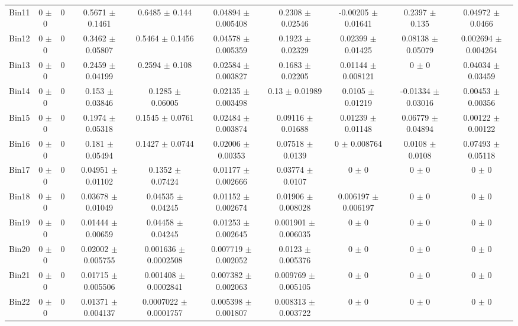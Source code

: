 \begin{tabular}{@{\extracolsep{4pt}}lccccccccc@{}}
     Bin11 & 0 $\pm$ 0 & 0 & 0.5671 $\pm$ 0.1461 & 0.6485 $\pm$ 0.144 & 0.04894 $\pm$ 0.005408 & 0.2308 $\pm$ 0.02546 & -0.00205 $\pm$ 0.01641 & 0.2397 $\pm$ 0.135 & 0.04972 $\pm$ 0.0466 \\ 
     Bin12 & 0 $\pm$ 0 & 0 & 0.3462 $\pm$ 0.05807 & 0.5464 $\pm$ 0.1456 & 0.04578 $\pm$ 0.005359 & 0.1923 $\pm$ 0.02329 & 0.02399 $\pm$ 0.01425 & 0.08138 $\pm$ 0.05079 & 0.002694 $\pm$ 0.004264 \\ 
     Bin13 & 0 $\pm$ 0 & 0 & 0.2459 $\pm$ 0.04199 & 0.2594 $\pm$ 0.108 & 0.02584 $\pm$ 0.003827 & 0.1683 $\pm$ 0.02205 & 0.01144 $\pm$ 0.008121 & 0 $\pm$ 0 & 0.04034 $\pm$ 0.03459 \\ 
     Bin14 & 0 $\pm$ 0 & 0 & 0.153 $\pm$ 0.03846 & 0.1285 $\pm$ 0.06005 & 0.02135 $\pm$ 0.003498 & 0.13 $\pm$ 0.01989 & 0.0105 $\pm$ 0.01219 & -0.01334 $\pm$ 0.03016 & 0.00453 $\pm$ 0.00356 \\ 
     Bin15 & 0 $\pm$ 0 & 0 & 0.1974 $\pm$ 0.05318 & 0.1545 $\pm$ 0.0761 & 0.02484 $\pm$ 0.003874 & 0.09116 $\pm$ 0.01688 & 0.01239 $\pm$ 0.01148 & 0.06779 $\pm$ 0.04894 & 0.00122 $\pm$ 0.00122 \\ 
     Bin16 & 0 $\pm$ 0 & 0 & 0.181 $\pm$ 0.05494 & 0.1427 $\pm$ 0.0744 & 0.02006 $\pm$ 0.00353 & 0.07518 $\pm$ 0.0139 & 0 $\pm$ 0.008764 & 0.0108 $\pm$ 0.0108 & 0.07493 $\pm$ 0.05118 \\ 
     Bin17 & 0 $\pm$ 0 & 0 & 0.04951 $\pm$ 0.01102 & 0.1352 $\pm$ 0.07424 & 0.01177 $\pm$ 0.002666 & 0.03774 $\pm$ 0.0107 & 0 $\pm$ 0 & 0 $\pm$ 0 & 0 $\pm$ 0 \\ 
     Bin18 & 0 $\pm$ 0 & 0 & 0.03678 $\pm$ 0.01049 & 0.04535 $\pm$ 0.04245 & 0.01152 $\pm$ 0.002674 & 0.01906 $\pm$ 0.008028 & 0.006197 $\pm$ 0.006197 & 0 $\pm$ 0 & 0 $\pm$ 0 \\ 
     Bin19 & 0 $\pm$ 0 & 0 & 0.01444 $\pm$ 0.00659 & 0.04458 $\pm$ 0.04245 & 0.01253 $\pm$ 0.002645 & 0.001901 $\pm$ 0.006035 & 0 $\pm$ 0 & 0 $\pm$ 0 & 0 $\pm$ 0 \\ 
     Bin20 & 0 $\pm$ 0 & 0 & 0.02002 $\pm$ 0.005755 & 0.001636 $\pm$ 0.0002508 & 0.007719 $\pm$ 0.002052 & 0.0123 $\pm$ 0.005376 & 0 $\pm$ 0 & 0 $\pm$ 0 & 0 $\pm$ 0 \\ 
     Bin21 & 0 $\pm$ 0 & 0 & 0.01715 $\pm$ 0.005506 & 0.001408 $\pm$ 0.0002841 & 0.007382 $\pm$ 0.002063 & 0.009769 $\pm$ 0.005105 & 0 $\pm$ 0 & 0 $\pm$ 0 & 0 $\pm$ 0 \\ 
     Bin22 & 0 $\pm$ 0 & 0 & 0.01371 $\pm$ 0.004137 & 0.0007022 $\pm$ 0.0001757 & 0.005398 $\pm$ 0.001807 & 0.008313 $\pm$ 0.003722 & 0 $\pm$ 0 & 0 $\pm$ 0 & 0 $\pm$ 0 \\ 

\end{tabular}

